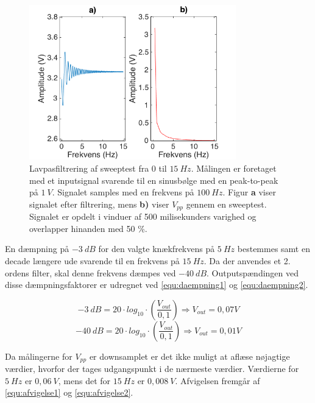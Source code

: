 \begin{figure}[H]
\centering
\includegraphics[width=0.8\textwidth]{figures/Lavpass_test}
\caption{Lavpasfiltrering af sweeptest fra 0 til $15~Hz$. Målingen er foretaget med et inputsignal svarende til en sinusbølge med en peak-to-peak på $1~V$. Signalet samples med en frekvens på $100~Hz$. Figur \textbf{a} viser signalet efter filtrering, mens \textbf{b)} viser $V_{pp}$ gennem en sweeptest. Signalet er opdelt i vinduer af 500 milisekunders varighed og overlapper hinanden med 50 \%.}
\label{fig:lavps_sweep}
\end{figure}

\noindent
En dæmpning på $-3~dB$ for den valgte knækfrekvens på $5~Hz$ bestemmes samt en decade længere ude svarende til en frekvens på $15~Hz$. Da der anvendes et 2. ordens filter, skal denne frekvens dæmpes ved $-40~dB$. Outputspændingen ved disse dæmpningsfaktorer er udregnet ved \autoref{equ:daempning1} og \autoref{equ:daempning2}. 

\begin{equation} \label{equ:daempning1}
-3~dB = 20 \cdot log_{10} \cdot (\frac{V_{out}}{0,1}) \Rightarrow V_{out} = 0,07 V
\end{equation}
\begin{equation} \label{equ:daempning2}
-40~dB = 20 \cdot log_{10} \cdot (\frac{V_{out}}{0,1}) \Rightarrow V_{out} = 0,01 V
\end{equation}

\noindent
Da målingerne for $V_{pp}$ er downsamplet er det ikke muligt at aflæse nøjagtige værdier, hvorfor der tages udgangspunkt i de nærmeste værdier. Værdierne for $5~Hz$ er $0,06~V$, mens det for $15~Hz$ er $0,008~V$. Afvigelsen fremgår af \autoref{equ:afvigelse1} og \autoref{equ:afvigelse2}.


